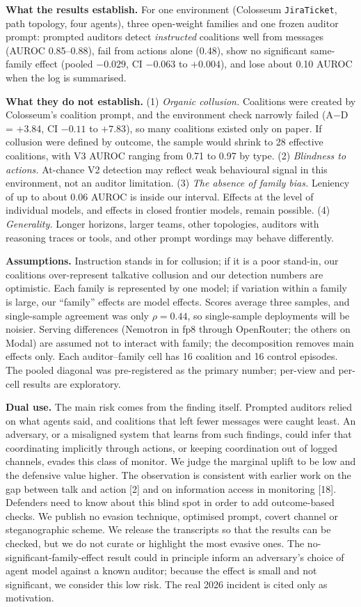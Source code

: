 \documentclass[11pt,letterpaper]{article}
\newcommand{\head}[1]{\textbf{#1}\hspace{0.3em}}
\begin{document}
\head{What the results establish.} For one environment (Colosseum \texttt{JiraTicket}, path topology, four agents), three open-weight families and one frozen auditor prompt: prompted auditors detect \emph{instructed} coalitions well from messages (AUROC 0.85--0.88), fail from actions alone (0.48), show no significant same-family effect (pooled $-0.029$, CI $-0.063$ to $+0.004$), and lose about 0.10 AUROC when the log is summarised.

\head{What they do not establish.} (1) \emph{Organic collusion.} Coalitions were created by Colosseum's coalition prompt, and the environment check narrowly failed (A$-$D = +3.84, CI $-0.11$ to $+7.83$), so many coalitions existed only on paper. If collusion were defined by outcome, the sample would shrink to 28 effective coalitions, with V3 AUROC ranging from 0.71 to 0.97 by type. (2) \emph{Blindness to actions.} At-chance V2 detection may reflect weak behavioural signal in this environment, not an auditor limitation. (3) \emph{The absence of family bias.} Leniency of up to about 0.06 AUROC is inside our interval. Effects at the level of individual models, and effects in closed frontier models, remain possible. (4) \emph{Generality.} Longer horizons, larger teams, other topologies, auditors with reasoning traces or tools, and other prompt wordings may behave differently.

\head{Assumptions.} Instruction stands in for collusion; if it is a poor stand-in, our coalitions over-represent talkative collusion and our detection numbers are optimistic. Each family is represented by one model; if variation within a family is large, our ``family'' effects are model effects. Scores average three samples, and single-sample agreement was only $\rho = 0.44$, so single-sample deployments will be noisier. Serving differences (Nemotron in fp8 through OpenRouter; the others on Modal) are assumed not to interact with family; the decomposition removes main effects only. Each auditor--family cell has 16 coalition and 16 control episodes. The pooled diagonal was pre-registered as the primary number; per-view and per-cell results are exploratory.

\head{Dual use.} The main risk comes from the finding itself. Prompted auditors relied on what agents said, and coalitions that left fewer messages were caught least. An adversary, or a misaligned system that learns from such findings, could infer that coordinating implicitly through actions, or keeping coordination out of logged channels, evades this class of monitor. We judge the marginal uplift to be low and the defensive value higher. The observation is consistent with earlier work on the gap between talk and action [2] and on information access in monitoring [18]. Defenders need to know about this blind spot in order to add outcome-based checks. We publish no evasion technique, optimised prompt, covert channel or steganographic scheme. We release the transcripts so that the results can be checked, but we do not curate or highlight the most evasive ones. The no-significant-family-effect result could in principle inform an adversary's choice of agent model against a known auditor; because the effect is small and not significant, we consider this low risk. The real 2026 incident is cited only as motivation.
\end{document}
